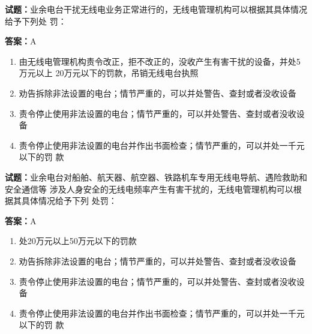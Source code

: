 \documentclass{ctexbook}
\begin{document}
\textbf{试题：}业余电台干扰无线电业务正常进行的，无线电管理机构可以根据其具体情况给予下列处
罚： 

\textbf{答案：}A 

\begin{enumerate}[leftmargin=3em]
  \item 由无线电管理机构责令改正，拒不改正的，没收产生有害干扰的设备，并处5万元以上
20万元以下的罚款，吊销无线电台执照 

  \item 劝告拆除非法设置的电台；情节严重的，可以并处警告、查封或者没收设备 

  \item 责令停止使用非法设置的电台；情节严重的，可以并处警告、查封或者没收设备 

  \item 责令停止使用非法设置的电台并作出书面检查；情节严重的，可以并处一千元以下的罚
款 

\end{enumerate}





\vspace{1em}

\textbf{试题：}业余电台对船舶、航天器、航空器、铁路机车专用无线电导航、遇险救助和安全通信等
涉及人身安全的无线电频率产生有害干扰的，无线电管理机构可以根据其具体情况给予下列
处罚： 

\textbf{答案：}A 

\begin{enumerate}[leftmargin=3em]
  \item 处20万元以上50万元以下的罚款 

  \item 劝告拆除非法设置的电台；情节严重的，可以并处警告、查封或者没收设备 

  \item 责令停止使用非法设置的电台；情节严重的，可以并处警告、查封或者没收设备 

  \item 责令停止使用非法设置的电台并作出书面检查；情节严重的，可以并处一千元以下的罚
款 

\end{enumerate}





\vspace{1em}
\end{document}
